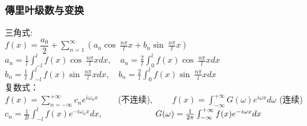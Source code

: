 \begin{frame}
    \frametitle{傳里叶级数与变换}
        三角式: \\ \vspace{0.3em}
        { $\displaystyle f(x) =\dfrac{a_0}{2} +\sum_{n=1}^{\infty}  \left(  a_n \cos~ \frac{n\pi}{l} x +  b_n \sin~ \frac{n\pi}{l} x  \right) $ }\\	
        { $\displaystyle a_n =\frac{1}{l}  \int_{-l}^{l}  f(x )   \cos~ \frac{n\pi}{l} x dx, \quad a_n =\frac{2}{l}  \int_{0}^{l}  f(x )   \cos~ \frac{n\pi}{l} x dx  $ }\\	
        { $\displaystyle b_n =\frac{1}{l}  \int_{-l}^{l}  f(x )   \sin~ \frac{n\pi}{l} x dx, \quad b_n =\frac{2}{l}  \int_{0}^{l}  f(x )   \sin~ \frac{n\pi}{l} x dx   $ }\\	\vspace{0.6em}
        复数式：\\ \vspace{0.3em}
        {$\displaystyle f(x) =\sum_{n=-\infty}^{+\infty}  c_n e^{i\omega_n x} \qquad $  (不连续),   $ \qquad f(x) = \int_{-\infty} ^{+\infty} G(\omega) e^{i \omega x} d \omega $ (连续)}\\	
        {$\displaystyle c_n =\frac{1}{2l}  \int_{-l}^{l}  f(x)    e^{-i\omega_n x}  dx  $, $ \hspace*{6em} G(\omega) = \frac{1}{2\pi}\int_{-\infty} ^{+\infty} f(x) e^{-i \omega x} d x $  } \\
\end{frame}

